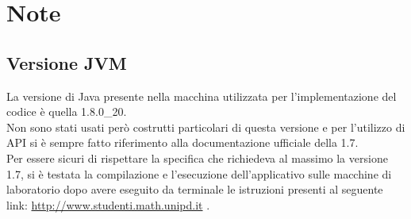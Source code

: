 % 
%
% 
%

\section{Note}
	\subsection{Versione JVM}
La versione di Java presente nella macchina utilizzata per l'implementazione del codice è quella 1.8.0\_20. \\
Non sono stati usati però costrutti particolari di questa versione e per l'utilizzo di API si è sempre fatto riferimento alla documentazione ufficiale della 1.7. \\
Per essere sicuri di rispettare la specifica che richiedeva al massimo la versione 1.7, si è testata la compilazione e l'esecuzione dell'applicativo sulle macchine di laboratorio dopo avere eseguito da terminale le istruzioni presenti al seguente link: \href{http://www.studenti.math.unipd.it/index.php?id=corsi#c620}{http://www.studenti.math.unipd.it} .
